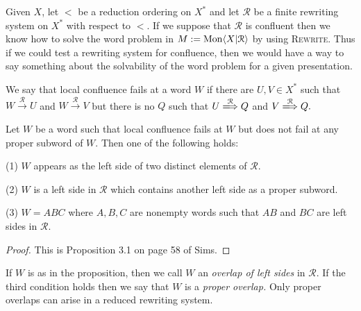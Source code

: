 \begin{ap} Given $X$, let $<$ be a reduction ordering on $X^*$ and let
    $\mathcal{R}$ be a finite rewriting system on $X^*$ with respect to $<$. If
    we suppose that $\mathcal{R}$ is confluent then we know how to solve the
    word problem in $M := \mathrm{Mon}\langle X|\mathcal{R}\rangle$ by using \textsc{Rewrite}. Thus
    if we could test a rewriting system for confluence, then we would have a
    way to say something about the solvability of the word problem for a given
    presentation.

    We say that local confluence fails at a word $W$ if there are $U,V \in X^*$
    such that $W \xrightarrow{\mathcal{R}} U$ and $W \xrightarrow{\mathcal{R}}
    V$ but there is no $Q$ such that $U \xLongrightarrow{\mathcal{R}} Q$ and $V
    \xLongrightarrow{\mathcal{R}} Q.$
\end{ap}

\begin{prop}\label{localfailure} Let $W$ be a word such that local confluence
    fails at $W$ but does not fail at any proper subword of $W$. Then one of
    the following holds:

    (1) $W$ appears as the left side of two distinct elements of $\mathcal{R}$.

    (2) $W$ is a left side in $\mathcal{R}$ which contains another left side as a proper subword.

    (3) $W = ABC$ where $A,B,C$ are nonempty words such that $AB$ and $BC$ are left sides in $\mathcal{R}$.
\end{prop}
\begin{proof} This is Proposition 3.1 on page 58 of Sims.
\end{proof}

\begin{defn} If $W$ is as in the proposition, then we call $W$ an \emph{overlap
    of left sides} in $\mathcal{R}$. If the third condition holds then we say
    that $W$ is a \emph{proper overlap.} Only proper overlaps can arise in a
    reduced rewriting system.
\end{defn}

